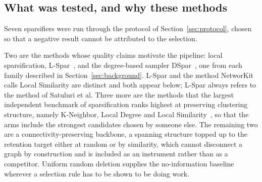 %
%
%

\subsection{What was tested, and why these methods}\label{sec:negative:arms}

Seven sparsifiers were run through the protocol of Section~\ref{sec:protocol}, chosen
so that a negative result cannot be attributed to the selection.

Two are the methods whose quality claims motivate the pipeline: local
sparsification, L-Spar~\cite{satuluri2011local}, and the degree-based sampler
DSpar~\cite{liu2023dspar}, one from each family described in
Section~\ref{sec:background}. L-Spar and the method NetworKit calls Local
Similarity are distinct and both appear below; L-Spar always refers to the method
of Satuluri et al. Three more are the methods that the largest
independent benchmark of sparsification ranks highest at preserving clustering
structure, namely K-Neighbor, Local Degree and Local
Similarity~\cite{chen2024demystifying, hamann2016structure}, so that the arms
include the strongest candidates chosen by someone else. The remaining two are a
connectivity-preserving backbone, a spanning structure topped up to the retention
target either at random or by similarity, which cannot disconnect a graph by
construction and is included as an instrument rather than as a competitor. Uniform
random deletion supplies the no-information baseline wherever a selection rule has
to be shown to be doing work.

